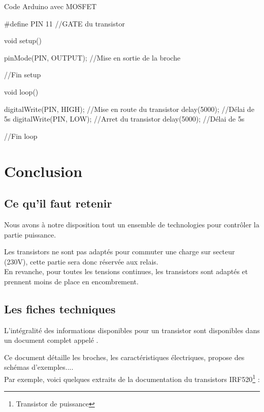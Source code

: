  \begin{Cpp}{Code Arduino avec MOSFET}

  #define PIN 11     //GATE du transistor
 
  void setup() {
  
    pinMode(PIN, OUTPUT); //Mise en sortie de la broche
  
  }//Fin setup
  
  void loop() {
  
    digitalWrite(PIN, HIGH);    //Mise en route du transistor
    delay(5000);               //Délai de 5s
    digitalWrite(PIN, LOW);     //Arret du transistor
    delay(5000);               //Délai de 5s
  
  }//Fin loop
  
 \end{Cpp}

 \chapter{Conclusion}

 \section{Ce qu'il faut retenir}

 
 Nous avons à notre disposition tout un ensemble de technologies pour contrôler la partie puissance.

 Les transistors ne sont pas adaptés pour commuter une charge sur secteur (230V), cette partie sera donc réservée aux relais.\\
 En revanche, pour toutes les tensions continues, les transistors sont adaptés et prennent moins de place en encombrement.\\

 \section{Les fiches techniques}

 L'intégralité des informations disponibles pour un transistor sont disponibles dans un document complet appelé .

 Ce document détaille les broches, les caractéristiques électriques, propose des schémas d'exemples....\\

 Par exemple, voici quelques extraits de la documentation du transistors IRF520\footnote{Transistor de puissance} :

